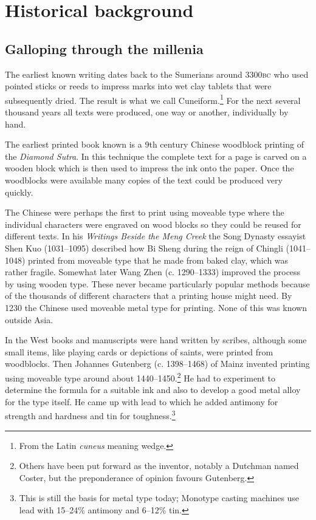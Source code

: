 \documentclass[10pt,a4paper,extrafontsizes]{memoir}
\begin{document}
\chapter{Historical background} \label{chap:history}

\section{Galloping through the millenia}

\begin{paracol}{2}
\switchEng
    The earliest known writing dates back to the Sumerians around 3300\textsc{bc}
who used pointed sticks or reeds to impress marks into wet clay tablets
that were subsequently dried. The result is what we call 
Cuneiform.\footnote{From the Latin \emph{cuneus} meaning wedge.}
For the next several thousand years all texts were produced, one way or 
another, individually by hand.

    The earliest printed book known is a 9th century Chinese woodblock
printing of the \emph{Diamond Sutra}. In this technique the complete text
for a page is carved on a wooden block which is then used to impress
the ink onto the paper. Once the woodblocks were available many copies 
of the text could be produced very quickly.

    The Chinese were perhaps the first to print using moveable 
type where 
the individual characters were engraved on wood blocks so they could be 
reused for different texts. In his \emph{Writings Beside the Meng Creek}
the Song Dynasty essayist Shen Kuo (1031--1095) 
described how Bi Sheng during the reign of 
Chingli (1041--1048) printed
from moveable type that he made from baked clay, which was rather fragile.
Somewhat later Wang Zhen (c. 1290--1333) improved the 
process by using
wooden type. These never became particularly popular methods because 
of the thousands of different characters that a printing house might need.
By 1230 the Chinese used moveable metal type for printing. None of this was 
known outside Asia.

    In the West books and manuscripts were hand written by scribes, 
although some
small items, like playing cards or depictions of saints, were printed
from woodblocks. Then Johannes Gutenberg 
(c. 1398--1468) of Mainz invented printing using moveable type 
around about 1440--1450.\footnote{Others have been put forward as the 
inventor, notably a Dutchman named Coster, but the preponderance of 
opinion favours Gutenberg.}
 He had to experiment to determine the formula for
a suitable ink and also to develop a good metal alloy 
for the type itself.
He came up with lead to which he added antimony for strength and hardness and
tin for toughness.\footnote{This is still the basis for metal type today;
Monotype casting machines use lead with 15--24\% antimony and 6--12\% tin.}


\end{paracol}
\end{document}
